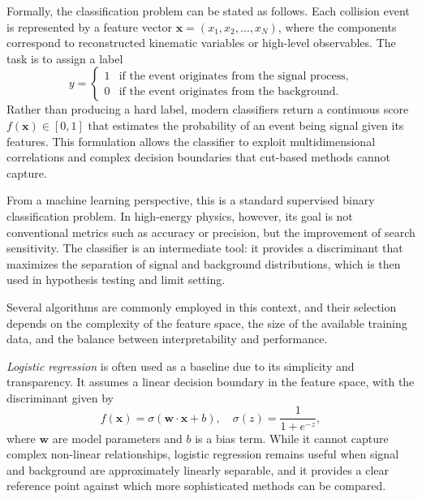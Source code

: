 Formally, the classification problem can be stated as follows. Each collision event is represented by a feature vector $\mathbf{x} = (x_1, x_2, \ldots, x_N)$, where the components correspond to reconstructed kinematic variables or high-level observables. The task is to assign a label
\begin{equation}
y =
\begin{cases}
1 & \text{if the event originates from the signal process}, \\
0 & \text{if the event originates from the background}.
\end{cases}
\end{equation}
Rather than producing a hard label, modern classifiers return a continuous score $f(\mathbf{x}) \in [0,1]$ that estimates the probability of an event being signal given its features. This formulation allows the classifier to exploit multidimensional correlations and complex decision boundaries that cut-based methods cannot capture.

From a machine learning perspective, this is a standard supervised binary classification problem. In high-energy physics, however, its goal is not conventional metrics such as accuracy or precision, but the improvement of search sensitivity. The classifier is an intermediate tool: it provides a discriminant that maximizes the separation of signal and background distributions, which is then used in hypothesis testing and limit setting.

Several algorithms are commonly employed in this context, and their selection depends on the complexity of the feature space, the size of the available training data, and the balance between interpretability and performance. 

\textit{Logistic regression} is often used as a baseline due to its simplicity and transparency. It assumes a linear decision boundary in the feature space, with the discriminant given by
\begin{equation}
f(\mathbf{x}) = \sigma(\mathbf{w} \cdot \mathbf{x} + b), \quad 
\sigma(z) = \frac{1}{1 + e^{-z}},
\end{equation}
where $\mathbf{w}$ are model parameters and $b$ is a bias term. While it cannot capture complex non-linear relationships, logistic regression remains useful when signal and background are approximately linearly separable, and it provides a clear reference point against which more sophisticated methods can be compared.

